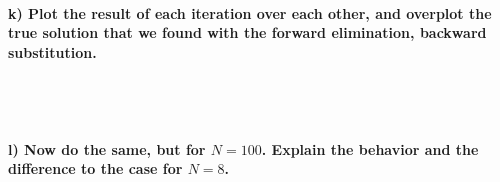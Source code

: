 \paragraph{
    k) Plot the result of each iteration over each other, and overplot 
    the true solution that we found with the forward elimination, 
    backward substitution.
} \ \\
    \\

\paragraph{
    l) Now do the same, but for $N=100$. Explain the behavior and the 
    difference to the case for $N=8$.
}
